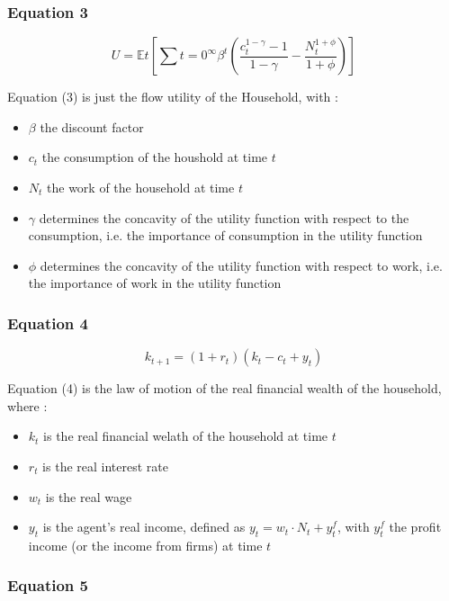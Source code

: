 \documentclass{article}
\begin{document}
\subsubsection*{Equation 3}
\begin{equation}
    U = \mathbb{E}t \left[ \sum{t=0}^{\infty} \beta^{t}\left(\frac{c_{t}^{1-\gamma}-1}{1-\gamma} - \frac{N_{t}^{1+\phi}}{1+\phi}\right)\right]
\end{equation}

Equation (3) is just the flow utility of the Household, with : 
\begin{itemize}
    \item $\beta$ the discount factor
    \item $c_{t}$ the consumption of the houshold at time $t$
    \item $N_{t}$ the work of the household at time $t$
    \item $\gamma$ determines the concavity of the utility function with respect to the consumption, i.e. the importance of consumption in the utility function
    \item $\phi$ determines the concavity of the utility function with respect to work, i.e. the importance of work in the utility function
\end{itemize}


\subsubsection*{Equation 4}
\begin{equation}
    k_{t+1}=(1+r_t)(k_{t}-c_{t}+y_{t})
\end{equation}

Equation (4) is the law of motion of the real financial wealth of the household, where : 
\begin{itemize}
    \item $k_t$ is the real financial welath of the household at time $t$
    \item $r_t$ is the real interest rate
    \item $w_t$ is the real wage
    \item $y_t$ is the agent's real income, defined as $y_t=w_t\cdot N_{t}+y_{t}^{f}$, with $y_{t}^{f}$ the profit income (or the income from firms) at time $t$
\end{itemize}

\subsubsection*{Equation 5}
\end{document}
